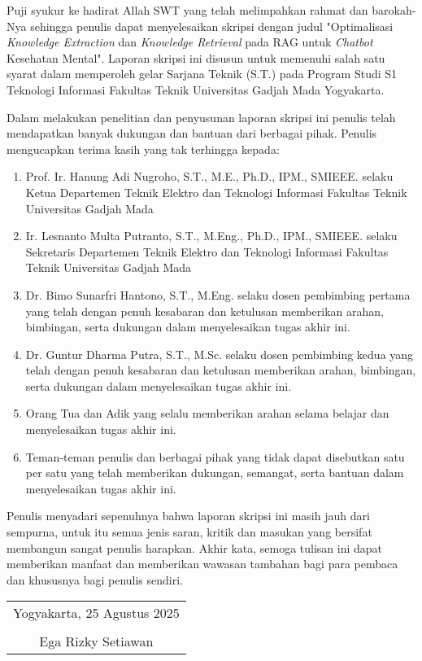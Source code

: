 Puji syukur ke hadirat Allah SWT yang telah melimpahkan rahmat dan barokah-Nya sehingga penulis dapat menyelesaikan skripsi dengan judul "Optimalisasi\textit{ Knowledge Extraction} dan \textit{Knowledge Retrieval} pada RAG untuk \textit{Chatbot} Kesehatan Mental".
Laporan skripsi ini disusun untuk memenuhi salah satu syarat dalam memperoleh gelar Sarjana Teknik (S.T.) pada Program Studi S1 Teknologi Informasi Fakultas Teknik Universitas Gadjah Mada Yogyakarta.


Dalam melakukan penelitian dan penyusunan laporan skripsi ini penulis telah mendapatkan banyak dukungan dan bantuan dari berbagai pihak. Penulis mengucapkan terima kasih yang tak terhingga kepada:

\begin{enumerate}
	\item Prof. Ir. Hanung Adi Nugroho, S.T., M.E., Ph.D., IPM., SMIEEE. selaku Ketua Departemen Teknik Elektro dan Teknologi Informasi Fakultas Teknik Universitas Gadjah Mada

	\item  Ir. Lesnanto Multa Putranto, S.T., M.Eng., Ph.D., IPM., SMIEEE. selaku Sekretaris Departemen Teknik Elektro dan Teknologi Informasi Fakultas Teknik Universitas Gadjah Mada

	\item Dr. Bimo Sunarfri Hantono, S.T., M.Eng. selaku dosen pembimbing pertama yang telah dengan penuh kesabaran dan ketulusan memberikan arahan, bimbingan, serta dukungan dalam menyelesaikan tugas akhir ini.

	\item Dr. Guntur Dharma Putra, S.T., M.Sc. selaku dosen pembimbing kedua yang telah dengan penuh kesabaran dan ketulusan memberikan arahan, bimbingan, serta dukungan dalam menyelesaikan tugas akhir ini.

	\item Orang Tua dan Adik yang selalu memberikan arahan selama belajar dan menyelesaikan tugas akhir ini.

	\item Teman-teman penulis dan berbagai pihak yang tidak dapat disebutkan satu per satu yang telah memberikan dukungan, semangat, serta bantuan dalam menyelesaikan tugas akhir ini.


\end{enumerate}

Penulis menyadari sepenuhnya bahwa laporan skripsi ini masih jauh dari sempurna, untuk itu semua jenis saran, kritik dan masukan yang bersifat membangun sangat penulis harapkan.
Akhir kata, semoga tulisan ini dapat memberikan manfaat dan memberikan wawasan tambahan bagi para pembaca dan khususnya bagi penulis sendiri.

\begin{flushright}
	\begin{tabular}{c}
		Yogyakarta, 25 Agustus 2025 \\
		\vspace{1cm}                \\
		Ega Rizky Setiawan
	\end{tabular}
\end{flushright}